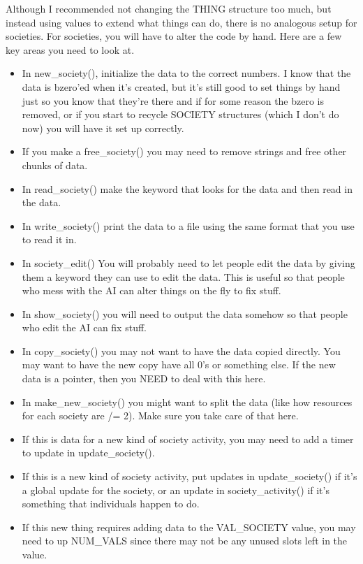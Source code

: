 Although I recommended not changing the THING structure too much, but instead
using values to extend what things can do, there is no analogous setup
for societies. For societies, you will have to alter the code by hand.
Here are a few key areas you need to look at.

\begin{itemize}

\item In new\_society(), initialize the data to the correct numbers. I know
that the data is bzero'ed when it's created, but it's still good to set
things by hand just so you know that they're there and if for some reason
the bzero is removed, or if you start to recycle SOCIETY structures
(which I don't do now) you will have it set up correctly.

\item If you make a free\_society() you may need to remove strings 
and free other chunks of data.

\item In read\_society() make the keyword that looks for the data and
then read in the data.

\item In write\_society() print the data to a file using the same format
that you use to read it in.

\item In society\_edit() You will probably need to let people edit the data by
giving them a keyword they can use to edit the data. This is useful
so that people who mess with the AI can alter things on the fly to
fix stuff.

\item In show\_society() you will need to output the data somehow so
that people who edit the AI can fix stuff.

\item In copy\_society() you may not want to have the data copied directly.
You may want to have the new copy have all 0's or something else.
If the new data is a pointer, then you NEED to deal with this 
here. 

\item In make\_new\_society() you might want to split the data (like
how resources for each society are /= 2). Make sure you take care of
that here.

\item If this is data for a new kind of society activity, you may need
to add a timer to update in update\_society().

\item If this is a new kind of society activity, put updates in
update\_society() if it's a global update for the society, or 
an update in society\_activity() if it's something that individuals
happen to do.

\item If this new thing requires adding data to the VAL\_SOCIETY value,
you may need to up NUM\_VALS since there may not be any unused slots
left in the value.

\end{itemize}

